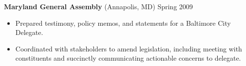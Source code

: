 \documentclass[margin]{res}
\newcommand{\locdatesubsection}[3]{\textbf{#1} (#2) \hfill #3}
\begin{document}
\begin{sloppypar}
\begin{resume}


\locdatesubsection{Maryland General Assembly}{Annapolis, MD}{Spring 2009}
\begin{itemize}
\item Prepared testimony, policy memos, and statements for a Baltimore City Delegate.
\item Coordinated with stakeholders to amend legislation, including meeting with constituents and succinctly communicating actionable concerns to delegate.
\end{itemize}



\end{resume}
\end{sloppypar}
\end{document}
